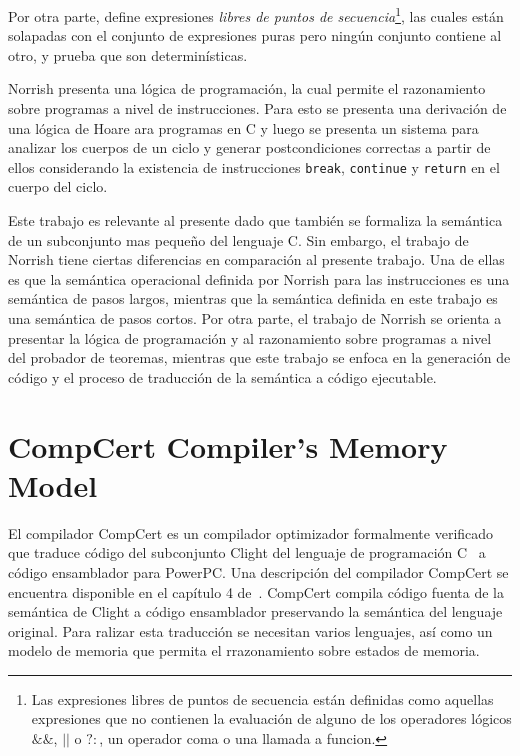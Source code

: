 Por otra parte, define expresiones \textit{libres de puntos de secuencia}\footnote{Las expresiones libres de puntos de secuencia están definidas como aquellas expresiones que no contienen la evaluación de alguno de los operadores lógicos $\&\&$, $||$ o $?:$, un operador coma o una llamada a funcion.}, las cuales están solapadas con el conjunto de expresiones puras pero ningún conjunto contiene al otro, y prueba que son determinísticas.

Norrish presenta una lógica de programación, la cual permite el razonamiento sobre programas a nivel de instrucciones.
Para esto se presenta una derivación de una lógica de Hoare ara programas en C y luego se presenta un sistema para analizar los cuerpos de un ciclo y generar postcondiciones correctas a partir de ellos considerando la existencia de instrucciones \verb|break|, \verb|continue| y \verb|return| en el cuerpo del ciclo.

Este trabajo es relevante al presente dado que también se formaliza la semántica de un subconjunto mas pequeño del lenguaje C.
Sin embargo, el trabajo de Norrish tiene ciertas diferencias en comparación al presente trabajo.
Una de ellas es que la semántica operacional definida por Norrish para las instrucciones es una semántica de pasos largos, mientras que la semántica definida en este trabajo es una semántica de pasos cortos.
Por otra parte, el trabajo de Norrish se orienta a presentar la lógica de programación y al razonamiento sobre programas a nivel del probador de teoremas, mientras que este trabajo se enfoca en la generación de código y el proceso de traducción de la semántica a código ejecutable.

\section{CompCert Compiler's Memory Model}

El compilador CompCert es un compilador optimizador formalmente verificado que traduce código del subconjunto Clight del lenguaje de programación C~\cite{clight} a código ensamblador para PowerPC.
Una descripción del compilador CompCert se encuentra disponible en el capítulo 4 de~\cite{compcert-float-point}.
CompCert compila código fuenta de la semántica de Clight a código ensamblador preservando la semántica del lenguaje original.
Para ralizar esta traducción se necesitan varios lenguajes, así como un modelo de memoria que permita el rrazonamiento sobre estados de memoria.

